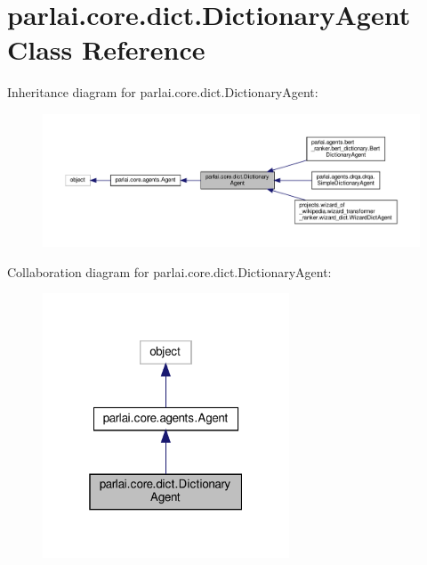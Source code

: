 \hypertarget{classparlai_1_1core_1_1dict_1_1DictionaryAgent}{}\section{parlai.\+core.\+dict.\+Dictionary\+Agent Class Reference}
\label{classparlai_1_1core_1_1dict_1_1DictionaryAgent}


Inheritance diagram for parlai.\+core.\+dict.\+Dictionary\+Agent\+:\nopagebreak
\begin{figure}[H]
\begin{center}
\leavevmode
\includegraphics[width=350pt]{d5/df4/classparlai_1_1core_1_1dict_1_1DictionaryAgent__inherit__graph}
\end{center}
\end{figure}


Collaboration diagram for parlai.\+core.\+dict.\+Dictionary\+Agent\+:
\nopagebreak
\begin{figure}[H]
\begin{center}
\leavevmode
\includegraphics[width=208pt]{d1/df9/classparlai_1_1core_1_1dict_1_1DictionaryAgent__coll__graph}
\end{center}
\end{figure}
